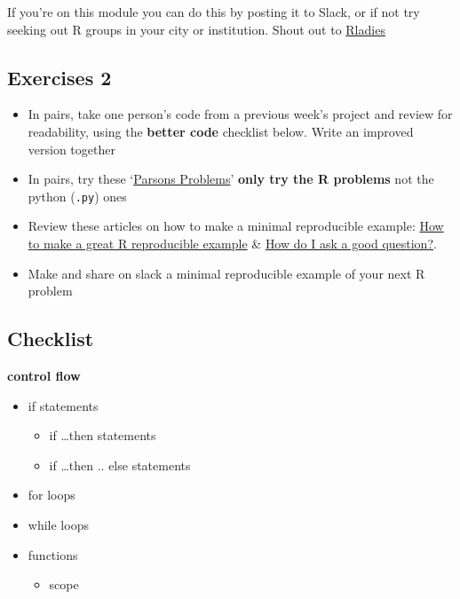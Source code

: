 \documentclass[
]{book}
\providecommand{\tightlist}{%
  \setlength{\itemsep}{0pt}\setlength{\parskip}{0pt}}
\begin{document}
If you're on this module you can do this by posting it to Slack, or if not try seeking out R groups in your city or institution. Shout out to \href{https://rladies.org/}{Rladies}

\hypertarget{exercises-2-1}{%
\subsection{Exercises 2}\label{exercises-2-1}}

\begin{itemize}
\tightlist
\item
  In pairs, take one person's code from a previous week's project and review for readability, using the \textbf{better code} checklist below. Write an improved version together
\item
  In pairs, try these `\href{https://github.com/tomstafford/parsonsproblems}{Parsons Problems}' \textbf{only try the R problems} not the python (\texttt{.py}) ones
\item
  Review these articles on how to make a minimal reproducible example: \href{https://stackoverflow.com/questions/5963269/how-to-make-a-great-r-reproducible-example}{How to make a great R reproducible example} \& \href{https://stackoverflow.com/help/how-to-ask}{How do I ask a good question?}.
\item
  Make and share on slack a minimal reproducible example of your next R problem
\end{itemize}

\hypertarget{checklist-4}{%
\subsection{Checklist}\label{checklist-4}}

\textbf{control flow}

\begin{itemize}
\tightlist
\item
  if statements

  \begin{itemize}
  \tightlist
  \item
    if \ldots then statements
  \item
    if \ldots then .. else statements
  \end{itemize}
\item
  for loops
\item
  while loops
\item
  functions

  \begin{itemize}
  \tightlist
  \item
    scope
  \end{itemize}
\end{itemize}
\end{document}

